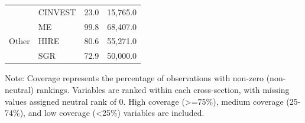 \begin{table}[htbp]
{\begin{tabular}{llrr}
 & CINVEST & 23.0 & 15,765.0 \\
\multirow{3}{*}{Other} & ME & 99.8 & 68,407.0 \\
 & HIRE & 80.6 & 55,271.0 \\
 & SGR & 72.9 & 50,000.0 \\
\bottomrule
\end{tabular}
}
\begin{tablenotes}
\small
\item Note: Coverage represents the percentage of observations with non-zero (non-neutral) rankings.
Variables are ranked within each cross-section, with missing values assigned neutral rank of 0.
High coverage (>=75\%), medium coverage (25-74\%), and low coverage (<25\%) variables are included.
\end{tablenotes}
\end{table}
